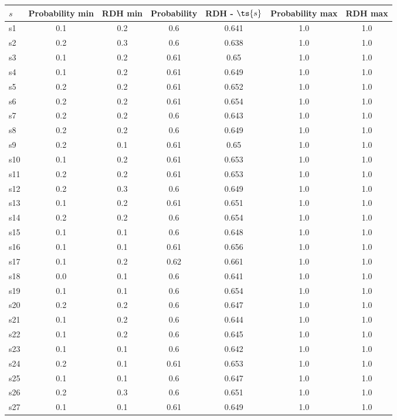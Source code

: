 \documentclass{article}
\begin{document}
\noindent\begin{tabular}{|l|c|c|c|c|c|c|}
\hline
$s$& Probability min & RDH min & Probability & RDH - $\ts{s}$ & Probability max & RDH max\\
\hline
s1 &0.1 & 0.2 & 0.6 & 0.641 & 1.0 & 1.0\\
\hline
s2 &0.2 & 0.3 & 0.6 & 0.638 & 1.0 & 1.0\\
\hline
s3 &0.1 & 0.2 & 0.61 & 0.65 & 1.0 & 1.0\\
\hline
s4 &0.1 & 0.2 & 0.61 & 0.649 & 1.0 & 1.0\\
\hline
s5 &0.2 & 0.2 & 0.61 & 0.652 & 1.0 & 1.0\\
\hline
s6 &0.2 & 0.2 & 0.61 & 0.654 & 1.0 & 1.0\\
\hline
s7 &0.2 & 0.2 & 0.6 & 0.643 & 1.0 & 1.0\\
\hline
s8 &0.2 & 0.2 & 0.6 & 0.649 & 1.0 & 1.0\\
\hline
s9 &0.2 & 0.1 & 0.61 & 0.65 & 1.0 & 1.0\\
\hline
s10 &0.1 & 0.2 & 0.61 & 0.653 & 1.0 & 1.0\\
\hline
s11 &0.2 & 0.2 & 0.61 & 0.653 & 1.0 & 1.0\\
\hline
s12 &0.2 & 0.3 & 0.6 & 0.649 & 1.0 & 1.0\\
\hline
s13 &0.1 & 0.2 & 0.61 & 0.651 & 1.0 & 1.0\\
\hline
s14 &0.2 & 0.2 & 0.6 & 0.654 & 1.0 & 1.0\\
\hline
s15 &0.1 & 0.1 & 0.6 & 0.648 & 1.0 & 1.0\\
\hline
s16 &0.1 & 0.1 & 0.61 & 0.656 & 1.0 & 1.0\\
\hline
s17 &0.1 & 0.2 & 0.62 & 0.661 & 1.0 & 1.0\\
\hline
s18 &0.0 & 0.1 & 0.6 & 0.641 & 1.0 & 1.0\\
\hline
s19 &0.1 & 0.1 & 0.6 & 0.654 & 1.0 & 1.0\\
\hline
s20 &0.2 & 0.2 & 0.6 & 0.647 & 1.0 & 1.0\\
\hline
s21 &0.1 & 0.2 & 0.6 & 0.644 & 1.0 & 1.0\\
\hline
s22 &0.1 & 0.2 & 0.6 & 0.645 & 1.0 & 1.0\\
\hline
s23 &0.1 & 0.1 & 0.6 & 0.642 & 1.0 & 1.0\\
\hline
s24 &0.2 & 0.1 & 0.61 & 0.653 & 1.0 & 1.0\\
\hline
s25 &0.1 & 0.1 & 0.6 & 0.647 & 1.0 & 1.0\\
\hline
s26 &0.2 & 0.3 & 0.6 & 0.651 & 1.0 & 1.0\\
\hline
s27 &0.1 & 0.1 & 0.61 & 0.649 & 1.0 & 1.0\\

\end{tabular}
\end{document}
